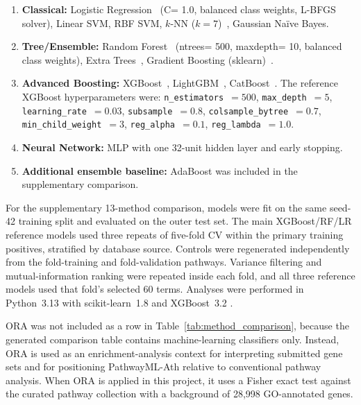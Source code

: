\documentclass[12pt,letterpaper,oneside,openany]{book}
\begin{document}
\begin{enumerate}[leftmargin=1.5em,label=\arabic*.]
\item \textbf{Classical:} Logistic Regression~\citep{pedregosa2011scikit} (C= 1.0, balanced class weights, L-BFGS solver),
Linear SVM, RBF SVM, $k$-NN ($k=7$)~\citep{cover1967nearest}, Gaussian Na\"{i}ve Bayes.
\item \textbf{Tree/Ensemble:} Random Forest~\citep{breiman2001random} (ntrees= 500, maxdepth= 10, balanced class weights),
Extra Trees~\citep{geurts2006extremely},
Gradient Boosting (sklearn)~\citep{friedman2001greedy}.
\item \textbf{Advanced Boosting:} XGBoost~\citep{chen2016xgboost},
LightGBM~\citep{ke2017lightgbm}, CatBoost~\citep{prokhorenkova2018catboost}. The reference XGBoost hyperparameters were:
\texttt{n\_estimators}~$= 500$, \texttt{max\_depth}~$= 5$,
\texttt{learning\_rate}~$= 0.03$, \texttt{subsample}~$= 0.8$,
\texttt{colsample\_bytree}~$= 0.7$, \texttt{min\_child\_weight}~$= 3$,
\texttt{reg\_alpha}~$= 0.1$, \texttt{reg\_lambda}~$= 1.0$.

\item \textbf{Neural Network:} MLP with one 32-unit hidden layer and early stopping.
\item \textbf{Additional ensemble baseline:} AdaBoost was included in the supplementary comparison.
\end{enumerate}

For the supplementary 13-method comparison, models were fit on the same seed-42 training split and evaluated on the outer test set. The main XGBoost/RF/LR reference models used three repeats of five-fold CV within the primary training positives, stratified by database source. Controls were regenerated independently from the fold-training and fold-validation pathways. Variance filtering and mutual-information ranking were repeated inside each fold, and all three reference models used that fold's selected 60 terms. Analyses were performed in Python~3.13 with scikit-learn~1.8 \citep{pedregosa2011scikit} and XGBoost~3.2 \citep{chen2016xgboost}.

ORA was not included as a row in Table~\ref{tab:method_comparison}, because the generated comparison table contains machine-learning classifiers only. Instead, ORA is used as an enrichment-analysis context for interpreting submitted gene sets and for positioning PathwayML-Ath relative to conventional pathway analysis. When ORA is applied in this project, it uses a Fisher exact test against the curated pathway collection with a background of 28,998 GO-annotated genes.
\end{document}
